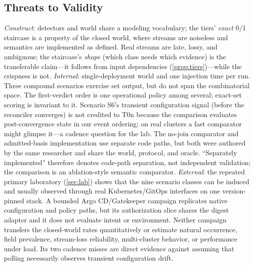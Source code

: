 \subsection{Threats to Validity}
\emph{Construct}: detectors and world share a modeling vocabulary; the tiers'
\emph{exact} 0/1 staircase is a property of the closed world, where streams
are noiseless and semantics are implemented as defined. Real streams are
late, lossy, and ambiguous; the staircase's \emph{shape} (which class needs
which evidence) is the transferable claim---it follows from input
dependencies (\cref{prop:tiers})---while the crispness is not.
\emph{Internal}: single-deployment world and one injection time per run. Three
compound scenarios exercise set output, but do not span the combinatorial
space. The first-verdict order is one operational policy among several;
exact-set scoring is invariant to it. Scenario S6's transient configuration signal
(before the reconciler converges) is not credited to T0n because the
comparison evaluates post-convergence state in our event ordering; on real
clusters a fast comparator might glimpse it---a cadence question for the lab.
The no-join comparator and admitted-basis implementation use separate code
paths, but both were authored by the same researcher and share the world,
protocol, and oracle. ``Separately implemented'' therefore denotes code-path
separation, not independent validation; the comparison is an ablation-style
semantic comparator.
\emph{External}: the repeated primary laboratory (\cref{sec:lab}) shows that the nine
scenario classes can be induced and usually observed through real
Kubernetes/GitOps interfaces on one version-pinned stack. A bounded
Argo CD/Gatekeeper campaign replicates native configuration and policy paths,
but its authorization slice shares the digest adapter and it does not evaluate
intent or environment. Neither campaign transfers the
closed-world rates quantitatively or estimate natural occurrence, field
prevalence, stream-loss reliability, multi-cluster behavior, or performance
under load. Its two cadence misses are direct evidence against assuming that
polling necessarily observes transient configuration drift.
